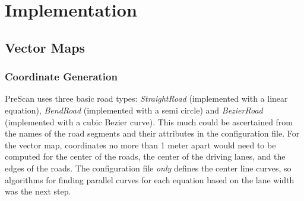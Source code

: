 \documentclass[12pt,twoside]{article}
\begin{document}
\section{Implementation}
\label{section:Implementation}

\subsection{Vector Maps}
\subsubsection{Coordinate Generation}
\label{sec:vmap-coords}
PreScan uses three basic road types: \textit{StraightRoad} (implemented with a linear equation), \textit{BendRoad} (implemented with a semi circle) and \textit{BezierRoad} (implemented with a cubic Bezier curve). This much could be ascertained from the names of the road segments and their attributes in the configuration file. For the vector map, coordinates no more than 1 meter apart would need to be computed for the center of the roads, the center of the driving lanes, and the edges of the roads. The configuration file \textit{only} defines the center line curves, so algorithms for finding parallel curves for each equation based on the lane width was the next step.
\end{document}
